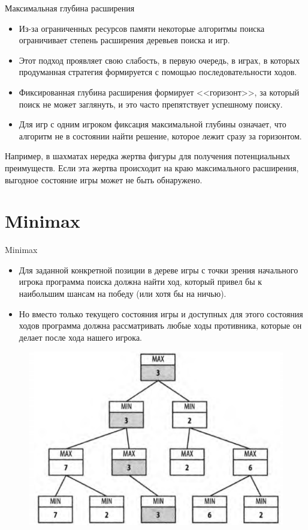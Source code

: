 \documentclass{beamer}
\begin{document}
\begin{frame}{Максимальная глубина расширения}
\begin{itemize}
\item Из-за ограниченных ресурсов памяти некоторые алгоритмы поиска ограничивает
степень расширения деревьев поиска и игр.
\item Этот подход проявляет свою слабость, в первую очередь, в играх, в которых продуманная стратегия формируется с помощью последовательности ходов.
\item Фиксированная глубина расширения формирует <<горизонт>>, за который поиск не может заглянуть, и это часто препятствует успешному поиску. 
\item Для игр с одним игроком фиксация максимальной глубины означает, что алгоритм не в состоянии найти решение, которое лежит сразу за горизонтом.
\end{itemize}
Например, в шахматах нередка жертва фигуры
для получения потенциальных преимуществ. Если эта жертва происходит на краю
максимального расширения, выгодное состояние игры может не быть обнаружено.
\end{frame}

\section{Minimax}

\begin{frame}{Minimax}
\begin{itemize}
\item Для заданной конкретной позиции в дереве игры с точки зрения начального
игрока программа поиска должна найти ход, который привел бы к наибольшим шансам на победу (или хотя бы на ничью). 
\item Но вместо только текущего состояния игры
и доступных для этого состояния ходов программа должна рассматривать любые
ходы противника, которые он делает после хода нашего игрока. 
\end{itemize}
\begin{figure}[h]
\centering
\includegraphics[scale=0.4]{images/lec05-pic02.png}
\end{figure}
\end{frame}
\end{document}
